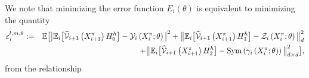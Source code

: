 \documentclass[12pt]{article}
\numberwithin{equation}{section}
\newcommand{\E}{\mathbb{E}}
\begin{document}
 We note that minimizing the error function $E_i(\theta)$
is equivalent to minimizing the quantity
\begin{eqnarray}
  \nonumber
  \varepsilon_i^{{l,m}, \theta}
 & := &
\E \big[ \big\lvert\E_i \big[\widehat{\cal V}_{i+1}\left(X^\pi_{i+1}\right) H_0^h\big] - {\cal Y}_i\left(X^\pi_i ;\theta\right)\big\rvert^2
		    + \big\lVert\E_i\big[\widehat{\cal V}_{i+1}\left(X^\pi_{i+1}\right)H_1^h\big] - {\cal Z}_i\left(X^\pi_i ;\theta\right)\big\rVert_d^2
                    \\
                    \label{fdsk}
	            & &
                    + \big\lVert\E_i\big[\widehat{\cal V}_{i+1}\left(X^\pi_{i+1}\right)H_2^h\big] - {\rm Sym} \left({\cal \gamma}_i\left(X^\pi_i ;\theta\right)\right) \big\rVert_{d\times d}^2\big],
\end{eqnarray}
 from the relationship
\end{document}
